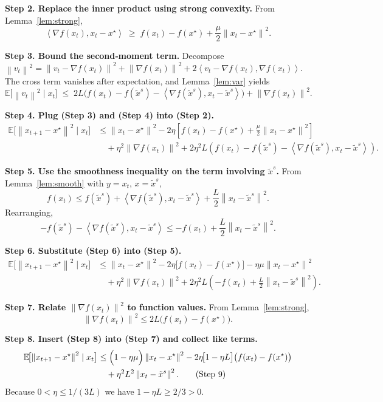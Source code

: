 \documentclass{article}
\newcommand{\E}{\mathbb{E}}
\newcommand{\norm}[1]{\left\|#1\right\|}
\newcommand{\inner}[2]{\left\langle #1,#2\right\rangle}
\newcommand{\grad}{\nabla}
\begin{document}
\noindent\textbf{Step 2. Replace the inner product using strong convexity.}  
From Lemma~\ref{lem:strong},
\[
\inner{\grad f(x_t)}{x_t-x^{\star}}
\;\ge\; f(x_t)-f(x^{\star})+\frac{\mu}{2}\norm{x_t-x^{\star}}^{2}. \tag{Step 3}
\]

\noindent\textbf{Step 3. Bound the second‑moment term.}  
Decompose $\norm{v_t}^{2}=\norm{v_t-\grad f(x_t)}^{2}+\norm{\grad f(x_t)}^{2}+2\inner{v_t-\grad f(x_t)}{\grad f(x_t)}$.
The cross term vanishes after expectation, and Lemma~\ref{lem:var} yields
\[
\E\!\bigl[\norm{v_t}^{2}\mid x_t\bigr]
\;\le\; 2L\bigl(f(x_t)-f(\tilde{x}^{s})-\inner{\grad f(\tilde{x}^{s})}{x_t-\tilde{x}^{s}}\bigr)
+\norm{\grad f(x_t)}^{2}. \tag{Step 4}
\]

\noindent\textbf{Step 4. Plug (Step 3) and (Step 4) into (Step 2).}
\begin{align}
\E\!\bigl[\norm{x_{t+1}-x^{\star}}^{2}\mid x_t\bigr]
&\le
\norm{x_t-x^{\star}}^{2}
-2\eta\!\left[f(x_t)-f(x^{\star})+\frac{\mu}{2}\norm{x_t-x^{\star}}^{2}\right] \nonumber\\
&\quad+\eta^{2}\norm{\grad f(x_t)}^{2}
+2\eta^{2}L\!\left(f(x_t)-f(\tilde{x}^{s})-\inner{\grad f(\tilde{x}^{s})}{x_t-\tilde{x}^{s}}\right). \tag{Step 5}
\end{align}

\noindent\textbf{Step 5. Use the smoothness inequality on the term involving $\tilde{x}^{s}$.}  
From Lemma~\ref{lem:smooth} with $y=x_t$, $x=\tilde{x}^{s}$,
\[
f(x_t)\le f(\tilde{x}^{s})+\inner{\grad f(\tilde{x}^{s})}{x_t-\tilde{x}^{s}}+\frac{L}{2}\norm{x_t-\tilde{x}^{s}}^{2}.
\]
Rearranging,
\[
-f(\tilde{x}^{s})-\inner{\grad f(\tilde{x}^{s})}{x_t-\tilde{x}^{s}}
\le -f(x_t)+\frac{L}{2}\norm{x_t-\tilde{x}^{s}}^{2}. \tag{Step 6}
\]

\noindent\textbf{Step 6. Substitute (Step 6) into (Step 5).}
\begin{align}
\E\!\bigl[\norm{x_{t+1}-x^{\star}}^{2}\mid x_t\bigr]
&\le
\norm{x_t-x^{\star}}^{2}
-2\eta\!\bigl[f(x_t)-f(x^{\star})\bigr]
-\eta\mu\norm{x_t-x^{\star}}^{2} \nonumber\\
&\quad+\eta^{2}\norm{\grad f(x_t)}^{2}
+2\eta^{2}L\!\left(-f(x_t)+\frac{L}{2}\norm{x_t-\tilde{x}^{s}}^{2}\right). \tag{Step 7}
\end{align}

\noindent\textbf{Step 7. Relate $\norm{\grad f(x_t)}^{2}$ to function values.}  
From Lemma~\ref{lem:strong},
\[
\norm{\grad f(x_t)}^{2}\le 2L\bigl(f(x_t)-f(x^{\star})\bigr). \tag{Step 8}
\]

\noindent\textbf{Step 8. Insert (Step 8) into (Step 7) and collect like terms.}
\begin{align}
\E\!\bigl[\norm{x_{t+1}-x^{\star}}^{2}\mid x_t\bigr]
&\le
\Bigl(1-\eta\mu\Bigr)\norm{x_t-x^{\star}}^{2}
-2\eta\!\bigl[1-\eta L\bigr]\bigl(f(x_t)-f(x^{\star})\bigr) \nonumber\\
&\quad+ \eta^{2}L^{2}\norm{x_t-\tilde{x}^{s}}^{2}. \tag{Step 9}
\end{align}
Because $0<\eta\le 1/(3L)$ we have $1-\eta L\ge 2/3>0$.
\end{document}
